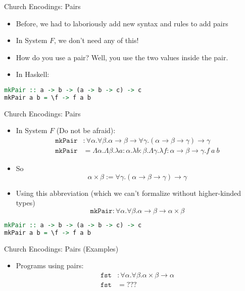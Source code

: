 \documentclass[leqno,presentation,usenames,dvipsnames]{beamer}
\begin{document}
\begin{frame}[fragile]{Church Encodings: Pairs}
    \begin{itemize}
        \item Before, we had to laboriously add new syntax and rules to add pairs
        \item In System $F$, we don't need any of this!
        \item How do you use a pair? Well, you use the two values inside the pair.
        \item In Haskell:
    \end{itemize}
\begin{lstlisting}[language=haskell, basicstyle=\small\ttfamily]
mkPair :: a -> b -> (a -> b -> c) -> c
mkPair a b = \f -> f a b
\end{lstlisting}
\end{frame}

\begin{frame}[fragile]{Church Encodings: Pairs}
    \begin{itemize}
        \item In System $F$ (Do not be afraid):
\begin{align*}
    \texttt{mkPair} &: \forall \alpha. \forall \beta. \alpha \to \beta \to \forall \gamma. (\alpha \to \beta \to \gamma) \to \gamma \\
    \texttt{mkPair} &= \Lambda \alpha. \Lambda \beta. \lambda a : \alpha. \lambda b : \beta. \Lambda \gamma. \lambda f : \alpha \to \beta \to \gamma. f~a~b
\end{align*}
        \item So
\[
    \alpha \times \beta := \forall \gamma. (\alpha \to \beta \to \gamma) \to \gamma
\]
        \item Using this abbreviation (which we can't formalize without higher-kinded types)
\[
    \texttt{mkPair} : \forall \alpha. \forall \beta. \alpha \to \beta \to \alpha \times \beta
\]
    \end{itemize}
\begin{lstlisting}[language=haskell, basicstyle=\small\ttfamily]
mkPair :: a -> b -> (a -> b -> c) -> c
mkPair a b = \f -> f a b
\end{lstlisting}
\end{frame}

\begin{frame}[fragile]{Church Encodings: Pairs (Examples)}
    \begin{itemize}
        \item Programs using pairs:
\begin{align*}
    \texttt{fst} & : \forall \alpha. \forall \beta. \alpha \times \beta \to \alpha \\
    \texttt{fst} & = ???
\end{align*}
    \end{itemize}
\end{frame}
\end{document}
